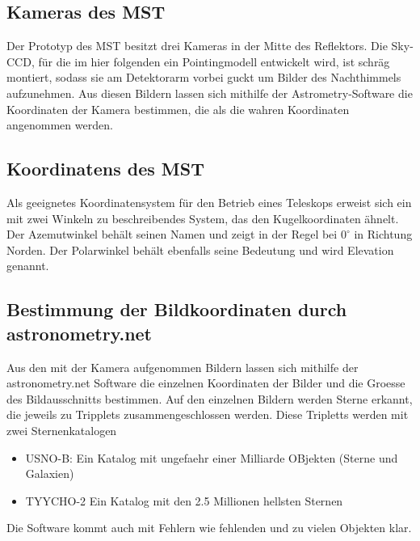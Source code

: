\subsection{Kameras des MST}
Der Prototyp des MST besitzt drei Kameras in der Mitte des Reflektors. Die Sky-CCD, für die im hier folgenden ein Pointingmodell entwickelt wird, ist schräg montiert, sodass sie am Detektorarm vorbei guckt um Bilder des Nachthimmels aufzunehmen. Aus diesen Bildern lassen sich mithilfe der Astrometry-Software die Koordinaten der Kamera bestimmen, die als die wahren Koordinaten angenommen werden.

\subsection{Koordinatens des MST}
Als geeignetes Koordinatensystem für den Betrieb eines Teleskops erweist sich ein mit zwei Winkeln zu beschreibendes System, das den Kugelkoordinaten ähnelt. Der Azemutwinkel behält seinen Namen und zeigt in der Regel bei $0^\circ$ in Richtung Norden. Der Polarwinkel behält ebenfalls seine Bedeutung und wird Elevation genannt.

\subsection{Bestimmung der Bildkoordinaten durch astronometry.net}
Aus den mit der Kamera aufgenommen Bildern lassen sich mithilfe der astronometry.net Software die einzelnen Koordinaten der Bilder und die Groesse des Bildausschnitts bestimmen. Auf den einzelnen Bildern werden Sterne erkannt, die jeweils zu Tripplets zusammengeschlossen werden. Diese Tripletts werden mit zwei Sternenkatalogen 
\begin{itemize}
\item USNO-B: Ein Katalog mit ungefaehr einer Milliarde OBjekten (Sterne und Galaxien)
\item TYYCHO-2 Ein Katalog mit den 2.5 Millionen hellsten Sternen
\end{itemize}
Die Software kommt auch mit Fehlern wie fehlenden und zu vielen Objekten klar.
